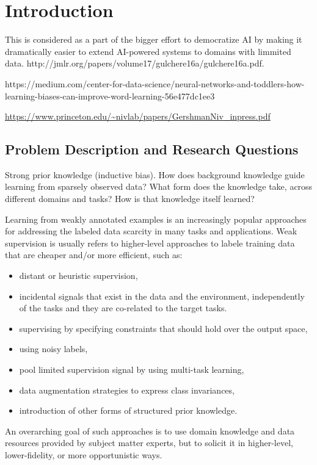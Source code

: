\chapter{Introduction}


This is considered as a part of the bigger effort to democratize AI by making it dramatically easier to extend AI-powered systems to domains with limmited data.
http://jmlr.org/papers/volume17/gulchere16a/gulchere16a.pdf.

https://medium.com/center-for-data-science/neural-networks-and-toddlers-how-learning-biases-can-improve-word-learning-56e477dc1ee3


\url{https://www.princeton.edu/~nivlab/papers/GershmanNiv_inpress.pdf}

\section{Problem Description and Research Questions}

Strong prior knowledge (inductive bias). How does background knowledge guide learning from sparsely observed data?  What form does the knowledge take, across different domains and tasks?
How is that knowledge itself learned? 

Learning from weakly annotated examples is an increasingly popular approaches for addressing the labeled data scarcity in many tasks and applications. 
Weak supervision is usually refers to higher-level approaches to labele training data that are cheaper and/or more efficient, such as:
\begin{itemize}
    \item distant or heuristic supervision,
    \item incidental signals that  exist in the data and the environment, independently of the tasks and they are co-related to the target tasks.
    \item supervising by specifying constraints that should hold over the output space,
    \item using noisy labels, 
    \item pool limited supervision signal by using multi-task learning,
    \item data augmentation strategies to express class invariances,
    \item introduction of other forms of structured prior knowledge.
\end{itemize}
An overarching goal of such approaches is to use domain knowledge and data resources provided by subject matter experts, but to solicit it in higher-level, lower-fidelity, or more opportunistic ways.

